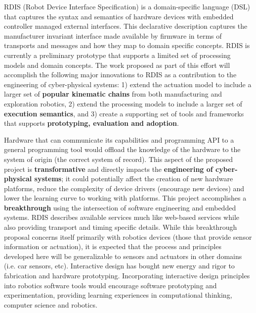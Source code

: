 RDIS (Robot Device Interface Specification) \cite{Anderson2012} is a domain-specific language (DSL) that captures the syntax and semantics of hardware devices with embedded controller managed external interfaces.  This declarative description captures the manufacturer invariant interface made available by firmware in terms of transports and messages and how they map to domain specific concepts.  RDIS is currently a preliminary prototype that supports a limited set of processing models and domain concepts.  The work proposed as part of this effort will accomplish the following major innovations to RDIS as a contribution to the engineering of cyber-physical systems: 1) extend the actuation model to include a larger set of {\bf popular kinematic chains} from both manufacturing and exploration robotics, 2) extend the processing models to include a larger set of {\bf execution semantics}, and 3) create a supporting set of tools and frameworks that supports {\bf prototyping, evaluation and adoption}.

Hardware that can communicate its capabilities and programming API to a general programming tool would offload the knowledge of the hardware to the system of origin (the correct system of record).  This aspect of the proposed project is {\bf transformative} and directly impacts the {\bf engineering of cyber-physical systems}; it could potentially affect the creation of new hardware platforms, reduce the complexity of device drivers (encourage new devices) and lower the learning curve to working with platforms.  This project accomplishes a {\bf breakthrough} using the intersection of software engineering and embedded systems.  RDIS describes available services much like web-based services while also providing transport and timing specific details.  While this breakthrough proposal concerns itself primarily with robotics devices (those that provide sensor information or actuation), it is expected that the process and principles developed here will be generalizable to sensors and actuators in other domains (i.e. car sensors, etc).  Interactive design has bought new energy and rigor to fabrication and hardware prototyping.  Incorporating interactive design principles into robotics software tools would encourage software prototyping and experimentation, providing learning experiences in computational thinking, computer science and robotics.  



